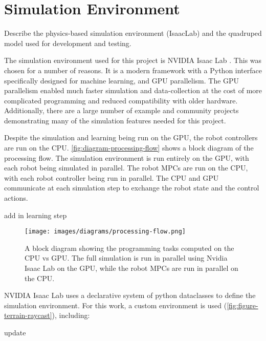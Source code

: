 \section{Simulation Environment}
\label{sec:simulation}

\begin{outline}
  Describe the physics-based simulation environment (IsaacLab) and
  the quadruped model used for development and testing.
\end{outline}

The simulation environment used for this project is NVIDIA Isaac Lab
\cite{mittal_orbit_2023}. This was chosen for a number of reasons. It
is a modern framework with a Python interface specifically designed
for machine learning, and GPU parallelism. The GPU parallelism
enabled much faster simulation and data-collection at the cost of
more complicated programming and reduced compatibility with older
hardware. Additionally, there are a large number of example and
community projects demonstrating many of the simulation features
needed for this project.

Despite the simulation and learning being run on the GPU, the
robot controllers are run on the CPU. \autoref{fig:diagram-processing-flow}
shows a block diagram of the processing flow. The simulation
environment is run entirely on the GPU, with each robot being
simulated in parallel. The robot MPCs are run on the CPU,
with each robot controller being run in parallel. The CPU and GPU
communicate at each simulation step to exchange the robot state and
the control actions.

\begin{todo}
  add in learning step
\end{todo}

\begin{figure}[H]
  \centering
  \texttt{[image: images/diagrams/processing-flow.png]}
  \caption{A block diagram showing the programming tasks computed on
    the CPU vs GPU. The full simulation is run in parallel using Nvidia
  Isaac Lab on the GPU, while the robot MPCs are run in parallel on the CPU.}
  \label{fig:diagram-processing-flow}
\end{figure}

NVIDIA Isaac Lab uses a declarative system of python dataclasses to
define the simulation environment. For this work, a custom
environment is used (\autoref{fig:figure-terrain-raycast}), including:

\begin{todo}
  update
\end{todo}

